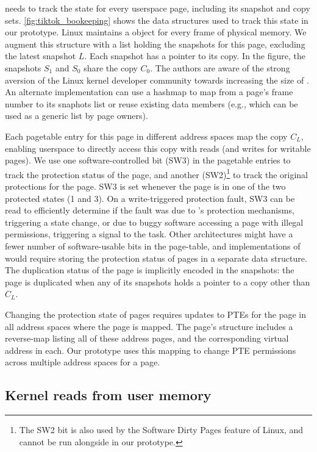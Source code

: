 \documentclass[letterpaper,twocolumn,10pt, anonymous]{article}
\begin{document}
\tiktok needs to track the state for every userspace page, including
its snapshot and copy sets.
\autoref{fig:tiktok_bookeeping} shows the data structures used to
track this state in our prototype.
Linux maintains a  object for every frame of 
physical memory. 
We augment this structure with a list holding the snapshots
for this page, excluding the latest snapshot $L$.
Each snapshot has a pointer to its copy. 
In the figure, the snapshots $S_1$ and $S_0$ share the copy $C_0$.
The authors are aware of the strong aversion of the 
Linux kernel developer community towards increasing the size of 
. 
An alternate implementation can use a hashmap to
map from a page's frame number to its snaphots list or
reuse existing data members (e.g.,  which 
can be used as a generic list by page owners).

Each pagetable entry for this page in different address spaces 
map the copy $C_L$, enabling userspace to directly access this
copy with reads (and writes for writable pages).
We use one software-controlled bit (SW3) in the pagetable entries 
to track the protection status of the page, and another 
(SW2)\footnote{The SW2 bit is also used by the Software Dirty Pages feature of 
Linux, and cannot be run alongside \tiktok in our prototype.}
to track the original protections for the page. 
SW3 is set whenever the page is in one of the two protected
states (1 and 3).
On a write-triggered protection fault, SW3 can be read to 
efficiently determine if the fault was due to \tiktok's protection 
mechanisms, triggering a state change, or due to buggy software
accessing a page with illegal permissions, triggering a signal to 
the task.
Other architectures might have a fewer number of software-usable 
bits in the page-table, and implementations of \tiktok would 
require storing the protection status of pages in a separate data structure.
The duplication status of the page is implicitly encoded in the 
snapshots: the page is duplicated when any of its snapshots
holds a pointer to a copy other than $C_L$.

Changing the protection state of pages requires updates to 
PTEs for the page in all address spaces where the page is mapped.
The page's  structure includes a reverse-map
listing all of these address pages, and the corresponding virtual
address in each.
Our prototype uses this mapping to change PTE permissions across
multiple address spaces for a page.

\subsection{Kernel reads from user memory}
\end{document}
